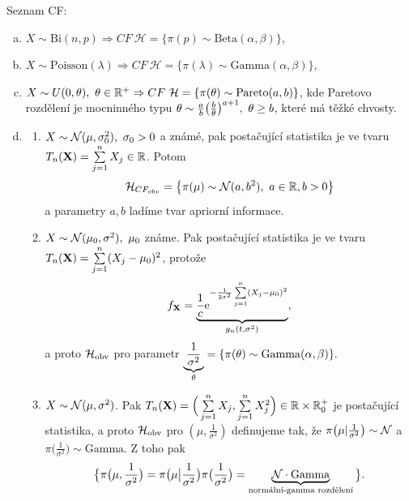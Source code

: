 \begin{example}
Seznam CF: \begin{enumerate}[a)]
	\item $X\sim \mathrm{Bi}(n,p)\Rightarrow CF~\mathcal{H}=\{\pi(p)\sim\mathrm{Beta}(\alpha,\beta)\}$,
	\item $X\sim\mathrm{Poisson}(\lambda)\Rightarrow CF~\mathcal{H}=\{\pi(\lambda)\sim\mathrm{Gamma}(\alpha,\beta)\}$,
	\item $X\sim U(0,\theta),~\theta\in\mathbb{R}^+\Rightarrow CF~\mathcal{H}=\{\pi(\theta)\sim\mathrm{Pareto}(a,b)\}$, kde Paretovo rozdělení je mocninného typu $\theta\sim\frac{a}{b}\big(\frac{b}{\theta}\big)^{a+1},~\theta\geq b$, které má těžké chvosty.
	\item \begin{enumerate}[1)]
		\item $X\sim \mathcal{N}(\mu,\sigma_0^2),~\sigma_0>0$ a známé, pak postačující statistika je ve tvaru $T_n(\textbf{X})=\sum\limits_{j=1}^{n} X_j\in\mathbb{R}$. Potom $$\mathcal{H}_{CF_{obv}}=\big\{\pi(\mu)\sim\mathcal{N}(a,b^2),~a\in\mathbb{R},b>0\big\}$$ a parametry $a,b$ ladíme tvar apriorní informace.
		\item $X\sim\mathcal{N}(\mu_0,\sigma^2),~\mu_0$ známe. Pak postačující statistika je ve tvaru $T_n(\textbf{X})=\sum\limits_{j=1}^{n}(X_j-\mu_0)^2$, protože 
		$$ f_{\textbf{X}}=\underbrace{\frac{1}{c}\mathrm{e}^{-\frac{1}{2\sigma^2}\sum\limits_{j=1}^{n}(X_j-\mu_0)^2}}_{g_n(t,\sigma^2)},$$ a proto $\mathcal{H}_\text{obv}$ pro parametr $\underbrace{\frac{1}{\sigma^2}}_{\theta}=\{\pi(\theta)\sim\mathrm{Gamma}(\alpha,\beta)\}.$
		\item $X\sim\mathcal{N}(\mu,\sigma^2)$. Pak $T_n(\textbf{X})=\Big(\sum\limits_{j=1}^{n} X_j,\sum\limits_{j=1}^{n} X_j^2\Big)\in\mathbb{R}\times\mathbb{R}_0^+$ je postačující statistika, a proto
		$\mathcal{H}_\text{obv}$ pro $(\mu,\frac{1}{\sigma^2})$ definujeme tak, že $\pi\big(\mu|\frac{
		1}{\sigma^2}\big)\sim\mathcal{N}$ a $\pi\big(\frac{1}{\sigma^2}\big)\sim\mathrm{Gamma}$. Z toho pak 
		$$\big\{ \pi\big(\mu,\frac{1}{\sigma^2}\big)=\pi\big(\mu\big|\frac{1}{\sigma^2}\big)\pi\big(\frac{1}{\sigma^2}\big)=\underbrace{\mathcal{N}\cdot\mathrm{Gamma}}_{\text{normální-gamma rozdělení}}\big\}.$$
	\end{enumerate}
\end{enumerate}
\end{example}
